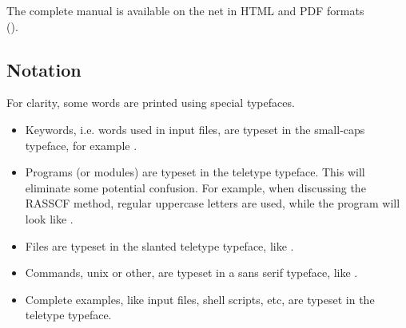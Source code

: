 The complete manual is available on the net in HTML and PDF formats \\
(\MolcasWWW).

\subsection{Notation}
\label{sec:notation}

For clarity, some words are printed using special typefaces.

\begin{itemize}
\item
Keywords, i.e. words used in input files, are typeset in
the small-caps typeface, for example .
\item
Programs (or modules) are typeset in the teletype typeface.
This will eliminate some potential confusion. For example,
when discussing the RASSCF method, regular uppercase letters
are used, while the program will look like .
\item
Files are typeset in the slanted teletype typeface, like
.
\item 
Commands, unix or other, are typeset in a sans serif typeface,
like .
\item
Complete examples, like input files, shell scripts, etc,
are typeset in the teletype typeface.
\end{itemize}
